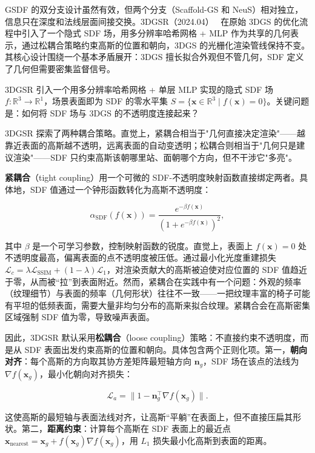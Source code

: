 GSDF 的双分支设计虽然有效，但两个分支（Scaffold-GS 和 NeuS）相对独立，信息只在深度和法线层面间接交换。3DGSR（2024.04）~\cite{2404_00409} 在原始 3DGS 的优化流程中引入了一个隐式 SDF 场，用多分辨率哈希网格 + MLP 作为共享的几何表示，通过松耦合策略约束高斯的位置和朝向，3DGS 的光栅化渲染管线保持不变。其核心设计围绕一个基本矛盾展开：3DGS 擅长拟合外观但不管几何，SDF 定义了几何但需要密集监督信号。

3DGSR 引入一个用多分辨率哈希网格 + 单层 MLP 实现的隐式 SDF 场 $f: \mathbb{R}^3 \to \mathbb{R}^1$，场景表面即为 SDF 的零水平集 $S = \{\mathbf{x} \in \mathbb{R}^3 \mid f(\mathbf{x}) = 0\}$。关键问题是：如何将 SDF 场与 3DGS 的不透明度连接起来？

3DGSR 探索了两种耦合策略。直觉上，紧耦合相当于"几何直接决定渲染"——越靠近表面的高斯越不透明，远离表面的自动变透明；松耦合则相当于"几何只是建议渲染"——SDF 只约束高斯该朝哪里站、面朝哪个方向，但不干涉它"多亮"。

\textbf{紧耦合}（tight coupling）用一个可微的 SDF-不透明度映射函数直接绑定两者。具体地，SDF 值通过一个钟形函数转化为高斯不透明度：

\begin{equation}
    \alpha_{\text{SDF}}(f(\mathbf{x})) = \frac{e^{-\beta f(\mathbf{x})}}{(1 + e^{-\beta f(\mathbf{x})})^2},
\end{equation}

其中 $\beta$ 是一个可学习参数，控制映射函数的锐度。直觉上，表面上 $f(\mathbf{x})=0$ 处不透明度最高，偏离表面的点不透明度被压低。通过最小化光度重建损失 $\mathcal{L}_c = \lambda \mathcal{L}_{\text{SSIM}} + (1-\lambda)\mathcal{L}_1$，对渲染贡献大的高斯被迫使对应位置的 SDF 值趋近于零，从而被“拉”到表面附近。然而，紧耦合在实践中有一个问题：外观的频率（纹理细节）与表面的频率（几何形状）往往不一致——一把纹理丰富的椅子可能有平坦的低频表面，需要大量非均匀分布的高斯来拟合纹理。紧耦合会在高斯密集区域强制 SDF 值为零，导致噪声表面。

因此，3DGSR 默认采用\textbf{松耦合}（loose coupling）策略：不直接约束不透明度，而是从 SDF 表面出发约束高斯的位置和朝向。具体包含两个正则化项。第一，\textbf{朝向对齐}：每个高斯的方向取其协方差矩阵最短轴方向 $\mathbf{n}_g$，SDF 场在该点的法线为 $\nabla f(\mathbf{x}_g)$，最小化朝向对齐损失：

\begin{equation}
    \mathcal{L}_a = \|1 - \mathbf{n}_g^\top \nabla f(\mathbf{x}_g)\|.
\end{equation}

这使高斯的最短轴与表面法线对齐，让高斯“平躺”在表面上，但不直接压扁其形状。第二，\textbf{距离约束}：计算每个高斯在 SDF 表面上的最近点 $\mathbf{x}_{\text{nearest}} = \mathbf{x}_g + f(\mathbf{x}_g)\nabla f(\mathbf{x}_g)$，用 $L_1$ 损失最小化高斯到表面的距离。

